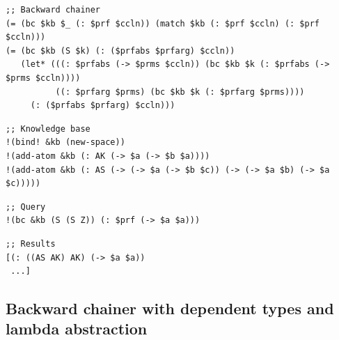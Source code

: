 \documentclass[aspectratio=169]{beamer}
\begin{document}
\begin{frame}[fragile]
  \begin{lstlisting}
;; Backward chainer
(= (bc $kb $_ (: $prf $ccln)) (match $kb (: $prf $ccln) (: $prf $ccln)))
(= (bc $kb (S $k) (: ($prfabs $prfarg) $ccln))
   (let* (((: $prfabs (-> $prms $ccln)) (bc $kb $k (: $prfabs (-> $prms $ccln))))
          ((: $prfarg $prms) (bc $kb $k (: $prfarg $prms))))
     (: ($prfabs $prfarg) $ccln)))
  \end{lstlisting}

  \pause

  \begin{lstlisting}
;; Knowledge base
!(bind! &kb (new-space))
!(add-atom &kb (: AK (-> $a (-> $b $a))))
!(add-atom &kb (: AS (-> (-> $a (-> $b $c)) (-> (-> $a $b) (-> $a $c)))))
  \end{lstlisting}

  \pause

  \begin{lstlisting}
;; Query
!(bc &kb (S (S Z)) (: $prf (-> $a $a)))
  \end{lstlisting}

  \pause

  \begin{lstlisting}
;; Results
[(: ((AS AK) AK) (-> $a $a))
 ...]
  \end{lstlisting}

\end{frame}

\subsection{Backward chainer with dependent types and lambda abstraction}
\end{document}

